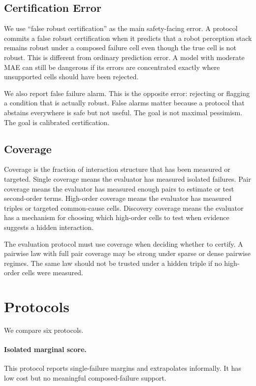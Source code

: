 \documentclass{article}
\begin{document}
\subsection{Certification Error}

We use ``false robust certification'' as the main safety-facing error. A protocol commits a false robust certification when it predicts that a robot perception stack remains robust under a composed failure cell even though the true cell is not robust. This is different from ordinary prediction error. A model with moderate MAE can still be dangerous if its errors are concentrated exactly where unsupported cells should have been rejected.

We also report false failure alarm. This is the opposite error: rejecting or flagging a condition that is actually robust. False alarms matter because a protocol that abstains everywhere is safe but not useful. The goal is not maximal pessimism. The goal is calibrated certification.

\subsection{Coverage}

Coverage is the fraction of interaction structure that has been measured or targeted. Single coverage means the evaluator has measured isolated failures. Pair coverage means the evaluator has measured enough pairs to estimate or test second-order terms. High-order coverage means the evaluator has measured triples or targeted common-cause cells. Discovery coverage means the evaluator has a mechanism for choosing which high-order cells to test when evidence suggests a hidden interaction.

The evaluation protocol must use coverage when deciding whether to certify. A pairwise law with full pair coverage may be strong under sparse or dense pairwise regimes. The same law should not be trusted under a hidden triple if no high-order cells were measured.

\section{Protocols}

We compare six protocols.

\paragraph{Isolated marginal score.}
This protocol reports single-failure margins and extrapolates informally. It has low cost but no meaningful composed-failure support.
\end{document}
